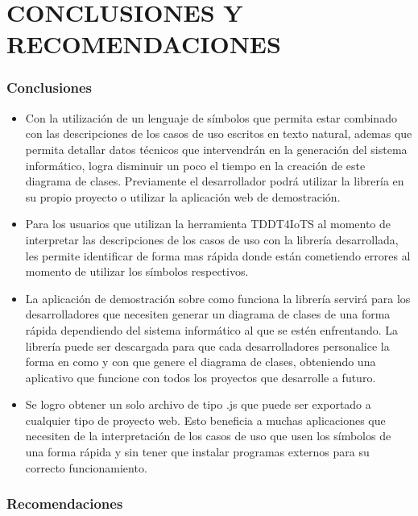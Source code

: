 \setcounter{chapter}{5}
\setcounter{section}{0}
\part{CONCLUSIONES Y RECOMENDACIONES}

\section{Conclusiones}

\begin{itemize}
	\item Con la utilización de un lenguaje de símbolos que permita estar combinado con las descripciones de los casos de uso escritos en texto natural, ademas que permita detallar datos técnicos que intervendrán en la generación del sistema informático, logra disminuir un poco el tiempo en la creación de este diagrama de clases. Previamente el desarrollador podrá utilizar la librería en su propio proyecto o utilizar la aplicación web de demostración.
	\item Para los usuarios que utilizan la herramienta TDDT4IoTS al momento de interpretar las descripciones de los casos de uso con la librería desarrollada, les permite identificar de forma mas rápida donde están cometiendo errores al momento de utilizar los símbolos respectivos.
	\item La aplicación de demostración sobre como funciona la librería servirá para los desarrolladores que necesiten generar un diagrama de clases de una forma rápida dependiendo del sistema informático al que se estén enfrentando. La librería puede ser descargada para que cada desarrolladores personalice la forma en como y con que genere el diagrama de clases, obteniendo una aplicativo que funcione con todos los proyectos que desarrolle a futuro.   
	\item Se logro obtener un solo archivo de tipo .js que puede ser exportado a cualquier tipo de proyecto web. Esto beneficia a muchas aplicaciones que necesiten de la interpretación de los casos de uso que usen los símbolos de una forma rápida y sin tener que instalar programas externos para su correcto funcionamiento.
\end{itemize}

\newpage
\section{Recomendaciones}
	

